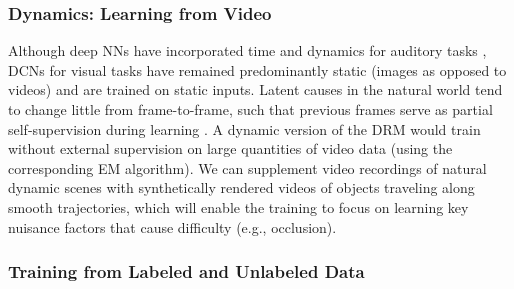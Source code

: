 \documentclass[12pt]{article}
\begin{document}
\subsubsection{Dynamics: Learning from Video} 
\label{sec:learning-dyn}

Although deep NNs have incorporated time and dynamics for auditory tasks \cite{hochreiter1997long, graves2013speech, graves2013hybrid}, DCNs for visual tasks have remained predominantly static (images as opposed to videos) and are trained on static inputs. Latent causes in the natural world tend to change little from frame-to-frame, such that previous frames serve as partial self-supervision during learning \cite{wiskott2006does}. 
A dynamic version of the DRM 
would train without external supervision on large quantities of video data (using the corresponding EM algorithm). 
We can supplement video recordings of natural dynamic scenes with synthetically rendered videos of objects traveling along smooth trajectories, which will enable the training to focus on learning key nuisance factors that cause difficulty (e.g., occlusion).


\subsubsection{Training from Labeled and Unlabeled Data}
\end{document}
